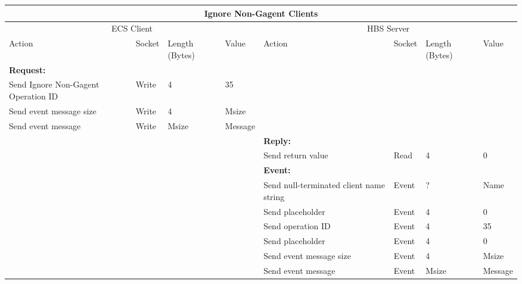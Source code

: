 \bigskip
\small
\begin{tabular}{|p{1.2in}|p{.4in}|p{.4in}|p{.5in}|p{1.2in}|p{.4in}|p{.4in}|p{.5in} |} \hline
\multicolumn{8}{|c|}{{\bf Ignore Non-Gagent Clients}} \\ \hline
\multicolumn{4}{|c|}{ECS Client} & \multicolumn{4}{|c|}{HBS Server} \\ \hline
Action            & Socket & Length  
                            (Bytes)& Value & Action       & Socket & Length 
                                                                    (Bytes)& Value \\ \hline
\multicolumn{4}{|l}{{\bf Request:}}&\multicolumn{4}{|l|}{~} \\ \hline
Send Ignore Non-Gagent Operation ID  & Write  & 4     & 35     &              &        &       &       \\ \hline
Send event
message size      & Write  & 4     &  Msize &         &        &       &       \\ \hline
Send event message
                  & Write  &  Msize  &  Message &     &        &       &       \\ \hline
\multicolumn{4}{|l}{~}&\multicolumn{4}{|l|}{{\bf Reply:}} \\ \hline
                  &        &       &       & Send return
                                             value        & Read   &  4    & 0       \\ \hline
\multicolumn{4}{|l}{~}&\multicolumn{4}{|l|}{{\bf Event:}} \\ \hline
                  &        &       &       & Send null-terminated client
                                             name string  & Event  &  ?    & Name  \\ \hline
                  &        &       &       & Send placeholder  & Event  &   4   &   0    \\  \hline
                  &        &       &       & Send operation 
                                             ID           & Event  &   4   &  35   \\ \hline
                  &        &       &       & Send placeholder    & Event  &   4   &  0    \\ \hline
                  &        &       &       & Send event message
                                                  size    & Event  &   4   &  Msize \\ \hline
                  &        &       &       & Send event message
                                                          & Event  & Msize & Message  \\ \hline
\end{tabular}
\normalsize
\bigskip


